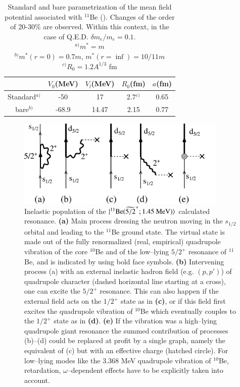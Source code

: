 \begin{table}
\begin{center}
\begin{tabular}{|c|c|c|c|c|}
\hline
  & $V_0$(MeV)  & $V_l$(MeV)  & $R_0$(fm) & $a$(fm)  \\ 
 \hline 
Standard$^{a)}$  & -50  & 17  & 2.7$^{c)}$ & 0.65  \\ 
 \hline 
bare$^{b)}$  & -68.9  & 14.47  & 2.15 & 0.77  \\ 
 \hline 
\end{tabular}
\end{center}
\caption{Standard and bare parametrization of the mean field potential associated with $^{11}$Be (\cite{Barranco:17}). Changes of the order of 20-30\% are observed. Within this context, in the case of Q.E.D. $\delta m_e/m_e=0.1$.\\$^{a)} m^*=m$\\ $^{b)} m^*(r=0)=0.7m$, $m^*(r=\inf)=10/11m$\\ $^{c)} R_0=1.2A^{1/3}$ fm\\ }\label{tab6.6.1}
\end{table} 

  \begin{figure}
  \centerline{\includegraphics*[width=10cm,angle=0]{C8/figsC8/fig6_6_1}}
  	\caption{Inelastic population of the $|{^{11}\text{Be}(\widetilde{5/2}^+; 1.45\text{ MeV})} \rangle$  calculated resonance. \textbf{(a)} Main process dressing the neutron moving in the $s_{1/2}$ orbital and leading to the $^{11}$Be ground state. The virtual state is made out of the fully renormalized (real, empirical) quadrupole vibration of the core $^{10}$Be and of the low--lying $5/2^+$ resonance of $^{11}$Be, and is indicated by using bold face symbols. \textbf{(b)} Intervening process (a) with an external inelastic hadron field (e.g. $(p,p')$) of quadrupole character (dashed horizontal line starting at a cross), one can excite the $5/2^+$ resonance. This can also happen if the external field acts on the $1/2^+$ state as in \textbf{(c)}, or if this  field first excites the quadrupole vibration of  $^{10}$Be which eventually couples to the $1/2^+$ state as in \textbf{(d)}. \textbf{(e)} If the vibration was a high--lying quadrupole giant resonance the summed contribution of processes {(b)}--{(d)} could be replaced at profit by a single graph, namely the equivalent of (c) but with an effective charge (hatched circle). For low--lying modes like the 3.368 MeV quadrupole vibration of $^{10}$Be, retardation, $\omega$--dependent effects have to be explicitly taken into account.}\label{fig6.6.1}
  \end{figure}

